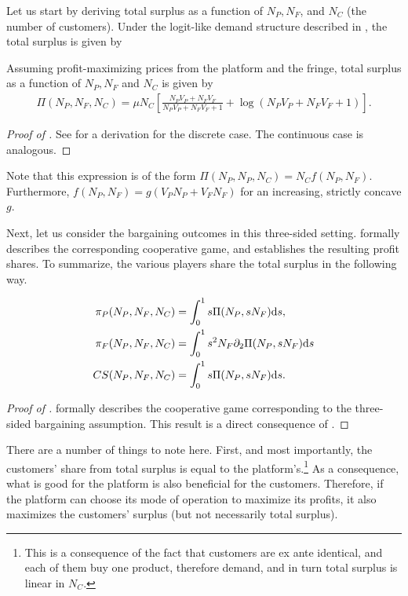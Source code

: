 Let us start by deriving total surplus as a function of $N_P, N_F$, and $N_C$ (the number of customers).
Under the logit-like demand structure described in , the total surplus is given by
\begin{proposition}
    \label{prop:profits_total_surplus}
    Assuming profit-maximizing prices from the platform and the fringe, total surplus as a function of $N_P, N_F$ and $N_C$ is given by
    \begin{align*}
        \Pi(N_P, N_F, N_C) = \mu N_C \left[ \frac{N_P V_P + N_F V_F}{N_P V_P + N_F V_F + 1} + \log(N_P V_P + N_F V_F + 1) \right].
    \end{align*}
\end{proposition}
\begin{proof}[Proof of ]
    See \textcite{small1981applied} for a derivation for the discrete case.
    The continuous case is analogous.
\end{proof}
Note that this expression is of the form $\Pi(N_P, N_P, N_C) = N_C f(N_P, N_F)$.
Furthermore, $f(N_P, N_F) = g(V_P N_P + V_F N_F)$ for an increasing, strictly concave $g$.

Next, let us consider the bargaining outcomes in this three-sided setting.
 formally describes the corresponding cooperative game, and  establishes the resulting profit shares.
To summarize, the various players share the total surplus in the following way.
\begin{proposition}
    \label{prop:three_way_shapley_value}
    \begin{align*}
        \pi_P(N_P, N_F, N_C) &= \int_0^1 s \Pi(N_P, s N_F) \mathrm{d}s, \\
        \pi_F(N_P, N_F, N_C) &= \int_0^1 s^2 N_F \partial_2 \Pi(N_P, s N_F) \mathrm{d}s \\
        CS(N_P, N_F, N_C) &= \int_0^1 s \Pi(N_P, s N_F) \mathrm{d}s.
    \end{align*}
\end{proposition}
\begin{proof}[Proof of ]
     formally describes the cooperative game corresponding to the three-sided bargaining assumption.
    This result is a direct consequence of .
\end{proof}

There are a number of things to note here.
First, and most importantly, the customers' share from total surplus is equal to the platform's.\footnote{
 This is a consequence of the fact that customers are ex ante identical, and each of them buy one product, therefore demand, and in turn total surplus is linear in $N_C$.
}
As a consequence, what is good for the platform is also beneficial for the customers.
Therefore, if the platform can choose its mode of operation to maximize its profits, it also maximizes the customers' surplus (but not necessarily total surplus).

